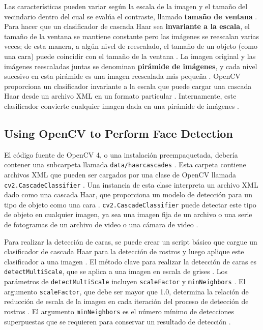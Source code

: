 \documentclass[a4paper]{article}
\begin{document}
Las características pueden variar según la escala de la imagen y el tamaño del vecindario dentro del cual se evalúa el contraste, llamado \textbf{tamaño de ventana} . Para hacer que un clasificador de cascada Haar sea \textbf{invariante a la escala}, el tamaño de la ventana se mantiene constante pero las imágenes se reescalan varias veces; de esta manera, a algún nivel de reescalado, el tamaño de un objeto (como una cara) puede coincidir con el tamaño de la ventana . La imagen original y las imágenes reescaladas juntas se denominan \textbf{pirámide de imágenes}, y cada nivel sucesivo en esta pirámide es una imagen reescalada más pequeña . OpenCV proporciona un clasificador invariante a la escala que puede cargar una cascada Haar desde un archivo XML en un formato particular . Internamente, este clasificador convierte cualquier imagen dada en una pirámide de imágenes .

\subsection{Using OpenCV to Perform Face Detection}

El código fuente de OpenCV 4, o una instalación preempaquetada, debería contener una subcarpeta llamada \texttt{data/haarcascades} . Esta carpeta contiene archivos XML que pueden ser cargados por una clase de OpenCV llamada \texttt{cv2.CascadeClassifier} . Una instancia de esta clase interpreta un archivo XML dado como una cascada Haar, que proporciona un modelo de detección para un tipo de objeto como una cara . \texttt{cv2.CascadeClassifier} puede detectar este tipo de objeto en cualquier imagen, ya sea una imagen fija de un archivo o una serie de fotogramas de un archivo de video o una cámara de video .

Para realizar la detección de caras, se puede crear un script básico que cargue un clasificador de cascada Haar para la detección de rostros y luego aplique este clasificador a una imagen . El método clave para realizar la detección de caras es \texttt{detectMultiScale}, que se aplica a una imagen en escala de grises . Los parámetros de \texttt{detectMultiScale} incluyen \texttt{scaleFactor} y \texttt{minNeighbors} . El argumento \texttt{scaleFactor}, que debe ser mayor que 1.0, determina la relación de reducción de escala de la imagen en cada iteración del proceso de detección de rostros . El argumento \texttt{minNeighbors} es el número mínimo de detecciones superpuestas que se requieren para conservar un resultado de detección .
\end{document}
